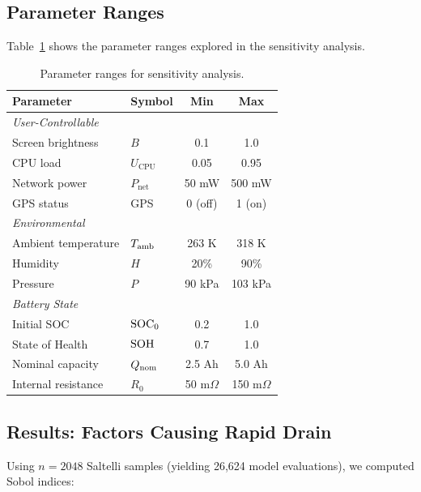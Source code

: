 \subsection{Parameter Ranges}
\label{subsec:param_ranges}

Table~\ref{tab:param_ranges} shows the parameter ranges explored in the sensitivity analysis.

\begin{table}[H]
    \centering
    \caption{Parameter ranges for sensitivity analysis.}
    \label{tab:param_ranges}
    \begin{tabular}{llcc}
        \toprule
        \textbf{Parameter} & \textbf{Symbol} & \textbf{Min} & \textbf{Max} \\
        \midrule
        \multicolumn{4}{l}{\textit{User-Controllable}} \\
        Screen brightness & $B$ & 0.1 & 1.0 \\
        CPU load & $U_{\text{CPU}}$ & 0.05 & 0.95 \\
        Network power & $P_{\text{net}}$ & 50 mW & 500 mW \\
        GPS status & GPS & 0 (off) & 1 (on) \\
        \midrule
        \multicolumn{4}{l}{\textit{Environmental}} \\
        Ambient temperature & $T_{\text{amb}}$ & 263 K & 318 K \\
        Humidity & $H$ & 20\% & 90\% \\
        Pressure & $P$ & 90 kPa & 103 kPa \\
        \midrule
        \multicolumn{4}{l}{\textit{Battery State}} \\
        Initial SOC & $\text{SOC}_0$ & 0.2 & 1.0 \\
        State of Health & $\text{SOH}$ & 0.7 & 1.0 \\
        Nominal capacity & $Q_{\text{nom}}$ & 2.5 Ah & 5.0 Ah \\
        Internal resistance & $R_0$ & 50 m$\Omega$ & 150 m$\Omega$ \\
        \bottomrule
    \end{tabular}
\end{table}

\subsection{Results: Factors Causing Rapid Drain}
\label{subsec:key_factors}

Using $n = 2048$ Saltelli samples (yielding 26,624 model evaluations), we computed Sobol indices:

